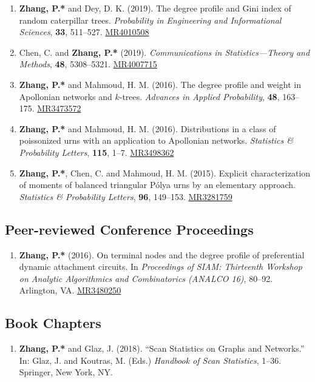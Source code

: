 \documentclass[margin]{res}
\def\MR#1{\href{http://www.ams.org/mathscinet-getitem?mr=#1}{MR#1}}
\begin{document}
\begin{resume}
\begin{enumerate}
	Clique-based method for network clustering. {\em Journal of 
	Classification}, \textbf{37}, 254--274. \MR{4111894}
	\item {\bf Zhang, P.*} and {\sc Dey, D. K.} (2019). The degree 
	profile and Gini index of random caterpillar trees. {\em 
	Probability in Engineering and Informational Sciences}, 
	\textbf{33}, 511--527. \MR{4010508}
	\item {\sc Chen, C.} and {\bf Zhang, P.*} (2019). {\em 
	Communications in Statistics---Theory and Methods}, \textbf{48}, 
	5308--5321. \MR{4007715}
	\item {\bf Zhang, P.*} and {\sc Mahmoud, H. M.} (2016). The 
	degree profile and weight in Apollonian networks and $k$-trees. 
	\emph{Advances in Applied Probability}, \textbf{48}, 163--175. 
	\MR{3473572}
	\item {\bf Zhang, P.*} and {\sc Mahmoud, H. M.} (2016). 
	Distributions in a class of poissonized urns with an application 
	to Apollonian networks. \emph{Statistics \& Probability 
	Letters}, {\bf 115}, 1--7. \MR{3498362}
	\item {\bf Zhang, P.*}, {\sc Chen, C.} and {\sc Mahmoud, H. M.} 
	(2015). Explicit characterization of moments of balanced 
	triangular P\'{o}lya urns by an elementary approach. 
	\emph{Statistics \& Probability Letters}, {\bf 96}, 149--153. 
	\MR{3281759}
\end{enumerate} 

\subsection{Peer-reviewed Conference Proceedings}
\begin{enumerate}
	\item {\bf Zhang, P.*} (2016). On terminal nodes and the degree 
	profile of preferential dynamic attachment circuits. In 
	\emph{Proceedings of SIAM: Thirteenth Workshop on Analytic 
	Algorithmics and Combinatorics (ANALCO 16)}, 80--92. Arlington, 
	VA. \MR{3480250}
\end{enumerate}

\subsection{Book Chapters}
\begin{enumerate}
	\item {\bf Zhang, P.*} and {\sc Glaz, J.} (2018). ``Scan 
	Statistics on Graphs and Networks.'' In: Glaz, J. and Koutras, 
	M. (Eds.) {\em Handbook of Scan Statistics}, 1--36. Springer, 
	New York, NY. 
\end{enumerate}


\end{resume}
\end{document}

